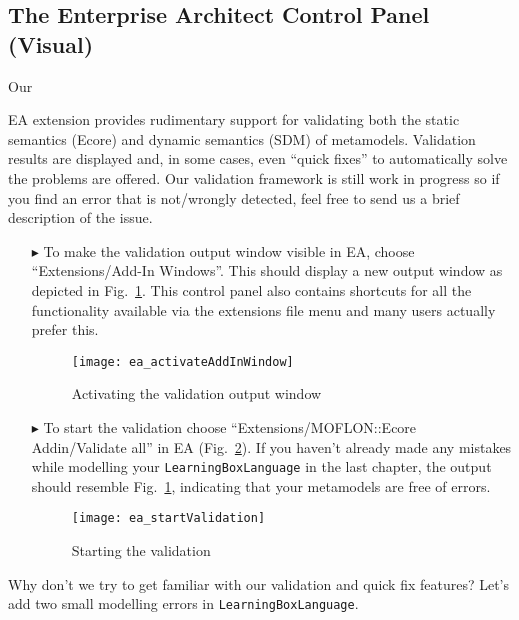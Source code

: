 \visHeader
\subsection{The Enterprise Architect Control Panel (Visual) }

\hypertarget{validation vis}{Our} EA extension provides rudimentary support for validating both the static semantics (Ecore) and dynamic semantics (SDM) of metamodels.
Validation results are displayed and, in some cases, even ``quick fixes'' to automatically solve the problems are offered.
Our validation framework is still work in progress so if you find an error that is not/wrongly detected, feel free to send us a brief description of the issue.

\begin{enumerate}
\item[$\blacktriangleright$] To make the validation output window visible in EA, choose ``Extensions/\-Add-In Windows''.
This should display a new output window as depicted in Fig.~\ref{fig:validation_output}. This control panel also contains shortcuts for all the functionality available via the extensions file menu and many users actually prefer this.

\begin{figure}[htbp]
	\centering
  \texttt{[image: ea\_activateAddInWindow]}
	\caption{Activating the validation output window}
	\label{fig:validation_output}
\end{figure}
\FloatBarrier

\item[$\blacktriangleright$] To start the validation choose ``Extensions/\-MOFLON::Ecore Addin/\-Validate all'' in EA (Fig.~\ref{fig:validation_menu}).
If you haven't already made any mistakes while modelling your \texttt{LearningBoxLanguage} in the last chapter, the output should resemble Fig.~\ref{fig:validation_output}, indicating that your metamodels are free of errors.

\begin{figure}[htbp]
	\centering
  \texttt{[image: ea\_startValidation]}
	\caption{Starting the validation}
	\label{fig:validation_menu}
\end{figure}
\FloatBarrier
\end{enumerate}


Why don't we try to get familiar with our validation and quick fix features? Let's add two small modelling errors in \texttt{LearningBoxLanguage}.

